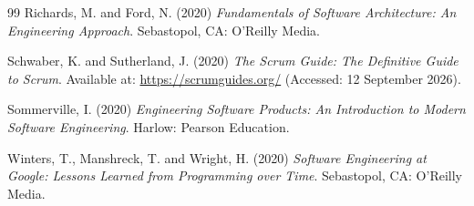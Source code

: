 \documentclass[a4paper,11pt]{article}
\begin{document}
\begin{thebibliography}{99}
Richards, M. and Ford, N. (2020) \textit{Fundamentals of Software Architecture:
An Engineering Approach}. Sebastopol, CA: O'Reilly Media.

Schwaber, K. and Sutherland, J. (2020) \textit{The Scrum Guide: The Definitive
Guide to Scrum}. Available at: \url{https://scrumguides.org/} (Accessed:
12 September 2026).

Sommerville, I. (2020) \textit{Engineering Software Products: An Introduction
to Modern Software Engineering}. Harlow: Pearson Education.

Winters, T., Manshreck, T. and Wright, H. (2020) \textit{Software Engineering
at Google: Lessons Learned from Programming over Time}. Sebastopol, CA:
O'Reilly Media.

\end{thebibliography}
\end{document}

